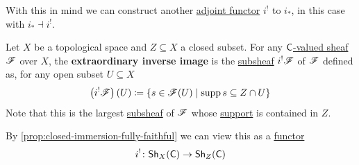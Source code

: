 \documentclass[../../main]{subfiles}
\begin{document}
With this in mind we can construct another \hyperref[def:adjoint-functors]{adjoint functor} \(i^{!}\) to \(i_{\ast}\), in this case with \(i_{\ast} \dashv i^{!}\).
\begin{definition}\label{def:extraordinary-inverse-image-sheaf}
  Let \(X\) be a topological space and \(Z \subseteq X\) a closed subset.
  For any \hyperref[def:sheaf]{\(\mathsf{C}\)-valued sheaf} \(\mathscr{F}\) over \(X\), the \textbf{extraordinary inverse image} is the \hyperref[def:types-of-morphisms-pre-sheaves]{subsheaf} \(i^{!}\mathscr{F}\) of \(\mathscr{F}\) defined as, for any open subset \(U \subseteq X\)
  \begin{equation*}
    \left(i^{!}\mathscr{F}\right)(U) \coloneq \{ s \in \mathscr{F}(U) \mid \operatorname{supp} s \subseteq Z \cap U\}
  \end{equation*}
  Note that this is the largest \hyperref[def:types-of-morphisms-pre-sheaves]{subsheaf} of \(\mathscr{F}\) whose \hyperref[def:support-sheaf]{support} is contained in \(Z\).
  
  By \autoref{prop:closed-immersion-fully-faithful} we can view this as a \hyperref[def:functor]{functor}
  \begin{equation*}
    i^{!}\colon \mathsf{Sh}_{X}(\mathsf{C}) \to \mathsf{Sh}_{Z}(\mathsf{C})
  \end{equation*}
\end{definition}
\end{document}
